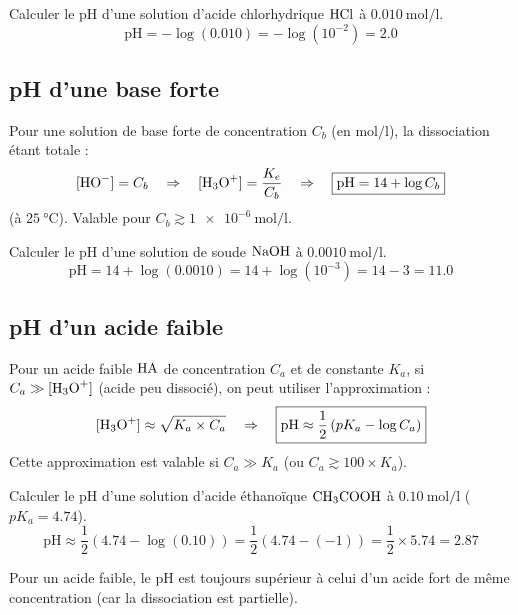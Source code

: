 \begin{exemple}
Calculer le pH d'une solution d'acide chlorhydrique $\ce{HCl}$ à $\SI{0.010}{\mol\per\litre}$.
\[
\text{pH} = -\log(0.010) = -\log(10^{-2}) = 2.0
\]
\end{exemple}

\subsection{pH d'une base forte}

\begin{propriete}
Pour une solution de base forte de concentration $C_b$ (en $\si{\mol\per\litre}$), la dissociation étant totale :
\[
[\ce{HO-}] = C_b \quad \Rightarrow \quad [\ce{H3O+}] = \frac{K_e}{C_b} \quad \Rightarrow \quad \boxed{\text{pH} = 14 + \log C_b}
\]
(à $\SI{25}{\celsius}$). Valable pour $C_b \gtrsim \SI{1e-6}{\mol\per\litre}$.
\end{propriete}

\begin{exemple}
Calculer le pH d'une solution de soude $\ce{NaOH}$ à $\SI{0.0010}{\mol\per\litre}$.
\[
\text{pH} = 14 + \log(0.0010) = 14 + \log(10^{-3}) = 14 - 3 = 11.0
\]
\end{exemple}

\subsection{pH d'un acide faible}

\begin{propriete}
Pour un acide faible $\ce{HA}$ de concentration $C_a$ et de constante $K_a$, si $C_a \gg [\ce{H3O+}]$ (acide peu dissocié), on peut utiliser l'approximation :
\[
[\ce{H3O+}] \approx \sqrt{K_a \times C_a} \quad \Rightarrow \quad \boxed{\text{pH} \approx \frac{1}{2} \left(pK_a - \log C_a\right)}
\]
Cette approximation est valable si $C_a \gg K_a$ (ou $C_a \gtrsim 100 \times K_a$).
\end{propriete}

\begin{exemple}
Calculer le pH d'une solution d'acide éthanoïque $\ce{CH3COOH}$ à $\SI{0.10}{\mol\per\litre}$ ($pK_a = 4.74$).
\[
\text{pH} \approx \frac{1}{2} \left(4.74 - \log(0.10)\right) = \frac{1}{2} \left(4.74 - (-1)\right) = \frac{1}{2} \times 5.74 = 2.87
\]
\end{exemple}

\begin{remarque}
Pour un acide faible, le pH est toujours supérieur à celui d'un acide fort de même concentration (car la dissociation est partielle).
\end{remarque}

